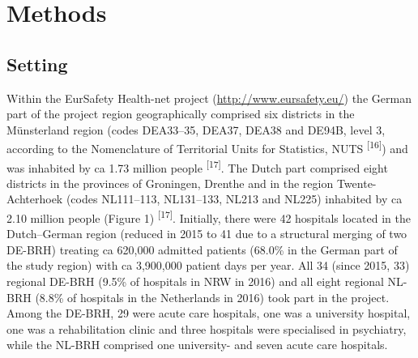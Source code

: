 \documentclass[
]{book}
\begin{document}
\hypertarget{methods-3}{%
\section{Methods}\label{methods-3}}

\hypertarget{setting}{%
\subsection{Setting}\label{setting}}

Within the EurSafety Health-net project (\url{http://www.eursafety.eu/}) the German part of the project region geographically comprised six districts in the Münsterland region (codes DEA33--35, DEA37, DEA38 and DE94B, level 3, according to the Nomenclature of Territorial Units for Statistics, NUTS \textsuperscript{{[}16{]}}) and was inhabited by ca 1.73 million people \textsuperscript{{[}17{]}}. The Dutch part comprised eight districts in the provinces of Groningen, Drenthe and in the region Twente-Achterhoek (codes NL111--113, NL131--133, NL213 and NL225) inhabited by ca 2.10 million people (Figure 1) \textsuperscript{{[}17{]}}. Initially, there were 42 hospitals located in the Dutch--German region (reduced in 2015 to 41 due to a structural merging of two DE-BRH) treating ca 620,000 admitted patients (68.0\% in the German part of the study region) with ca 3,900,000 patient days per year. All 34 (since 2015, 33) regional DE-BRH (9.5\% of hospitals in NRW in 2016) and all eight regional NL-BRH (8.8\% of hospitals in the Netherlands in 2016) took part in the project. Among the DE-BRH, 29 were acute care hospitals, one was a university hospital, one was a rehabilitation clinic and three hospitals were specialised in psychiatry, while the NL-BRH comprised one university- and seven acute care hospitals.
\end{document}
